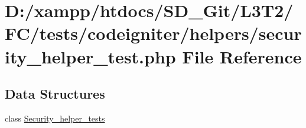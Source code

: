 \hypertarget{security__helper__test_8php}{}\section{D\+:/xampp/htdocs/\+S\+D\+\_\+\+Git/\+L3\+T2/\+F\+C/tests/codeigniter/helpers/security\+\_\+helper\+\_\+test.php File Reference}
\label{security__helper__test_8php}
\subsection*{Data Structures}
\begin{DoxyCompactItemize}
\item 
class \hyperlink{class_security__helper__tests}{Security\+\_\+helper\+\_\+tests}
\end{DoxyCompactItemize}
